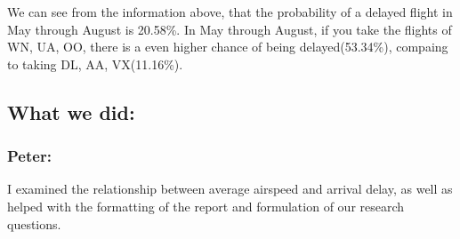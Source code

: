 \documentclass[]{article}
\newenvironment{Shaded}{\begin{snugshade}}{\end{snugshade}}
\newcommand{\KeywordTok}[1]{\textcolor[rgb]{0.13,0.29,0.53}{\textbf{#1}}}
\newcommand{\DecValTok}[1]{\textcolor[rgb]{0.00,0.00,0.81}{#1}}
\newcommand{\StringTok}[1]{\textcolor[rgb]{0.31,0.60,0.02}{#1}}
\newcommand{\OperatorTok}[1]{\textcolor[rgb]{0.81,0.36,0.00}{\textbf{#1}}}
\newcommand{\NormalTok}[1]{#1}
\begin{document}
\begin{Shaded}
\end{Shaded}

We can see from the information above, that the probability of a delayed
flight in May through August is 20.58\%. In May through August, if you
take the flights of WN, UA, OO, there is a even higher chance of being
delayed(53.34\%), compaing to taking DL, AA, VX(11.16\%).

\subsection{What we did:}\label{what-we-did}

\subsubsection{Peter:}\label{peter-2}

I examined the relationship between average airspeed and arrival delay,
as well as helped with the formatting of the report and formulation of
our research questions.
\end{document}
